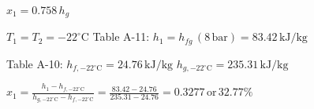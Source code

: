 \( x_1 = 0.758 \, h_g \)  

\( T_1 = T_2 = -22^\circ \text{C} \)  
Table A-11:  
\( h_1 = h_{fg} \, (8 \, \text{bar}) = 83.42 \, \text{kJ/kg} \)  

Table A-10:  
\( h_{f, -22^\circ \text{C}} = 24.76 \, \text{kJ/kg} \)  
\( h_{g, -22^\circ \text{C}} = 235.31 \, \text{kJ/kg} \)  

\( x_1 = \frac{h_1 - h_{f, -22^\circ \text{C}}}{h_{g, -22^\circ \text{C}} - h_{f, -22^\circ \text{C}}} = \frac{83.42 - 24.76}{235.31 - 24.76} = 0.3277 \, \text{or} \, 32.77\% \)